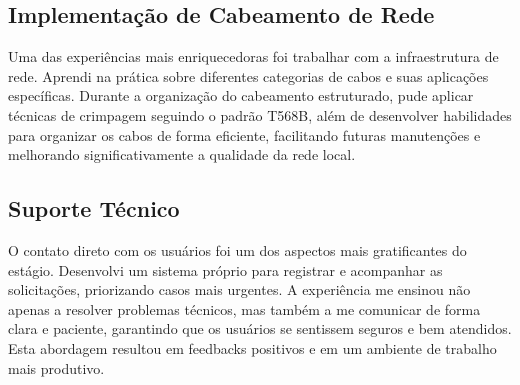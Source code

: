 \subsection{Implementação de Cabeamento de Rede}

Uma das experiências mais enriquecedoras foi trabalhar com a infraestrutura de rede. Aprendi na prática sobre diferentes categorias de cabos e suas aplicações específicas. Durante a organização do cabeamento estruturado, pude aplicar técnicas de crimpagem seguindo o padrão T568B, além de desenvolver habilidades para organizar os cabos de forma eficiente, facilitando futuras manutenções e melhorando significativamente a qualidade da rede local.

\subsection{Suporte Técnico}

O contato direto com os usuários foi um dos aspectos mais gratificantes do estágio. Desenvolvi um sistema próprio para registrar e acompanhar as solicitações, priorizando casos mais urgentes. A experiência me ensinou não apenas a resolver problemas técnicos, mas também a me comunicar de forma clara e paciente, garantindo que os usuários se sentissem seguros e bem atendidos. Esta abordagem resultou em feedbacks positivos e em um ambiente de trabalho mais produtivo.

